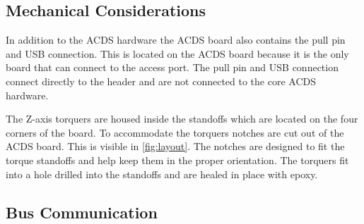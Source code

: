 \subsection{Mechanical Considerations}
In addition to the \ac{ACDS} hardware the \ac{ACDS} board also contains the pull pin and USB connection. This is located on the \ac{ACDS} board because it is the only board that can connect to the access port. The pull pin and USB connection connect directly to the header and are not connected to the core \ac{ACDS} hardware. 

The Z-axis torquers are housed inside the standoffs which are located on the four corners of the board. To accommodate the torquers notches are cut out of the \ac{ACDS} board. This is visible in \autoref{fig:layout}. The notches are designed to fit the torque standoffs and help keep them in the proper orientation. The torquers fit into a hole drilled into the standoffs and are healed in place with epoxy. 


\subsection{Bus Communication}

